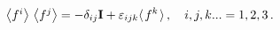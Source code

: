 \begin{equation}\label{algf}
{{\textstyle  \left<f^i\right>\,\left<f^j\right>}=-\delta_{ij} {\bf  I}} +
\varepsilon_{ijk} {\textstyle  
\left< \right.} f^k {\left. \textstyle \right>}\,, 
\quad i,j,k...=1,2,3\,. 
\end{equation}

